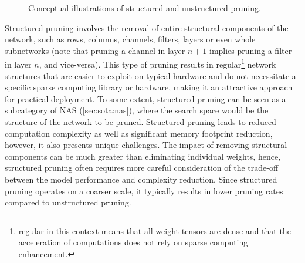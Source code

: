 \begin{figure}
\centering
{}
    \hspace{0.09\textwidth}
\caption{Conceptual illustrations of structured and unstructured pruning.}
\label{fig:sota:pruning}
\end{figure}

Structured pruning involves the removal of entire structural components of the
network, such as rows, columns, channels, filters, layers or even whole
subnetworks (note that pruning a channel in layer $n+1$ implies pruning a
filter in layer $n$, and vice-versa). This type of pruning results in
regular\footnote{regular in this context means that all weight tensors are dense
and that the acceleration of computations does not rely on sparse computing
enhancement.} network structures that are easier to exploit on typical hardware
and do not necessitate a specific sparse computing library or hardware, making
it an attractive approach for practical deployment. To some extent, structured
pruning can be seen as a subcategory of \acl{NAS} (\cref{sec:sota:nas}), where
the search space would be the structure of the network to be pruned. Structured
pruning leads to reduced computation complexity as well as significant memory
footprint reduction, however, it also presents unique challenges. The impact of
removing structural components can be much greater than eliminating individual
weights, hence, structured pruning often requires more careful consideration of
the trade-off between the model performance and complexity reduction. Since
structured pruning operates on a coarser scale, it typically results in lower
pruning rates compared to unstructured pruning.\\


